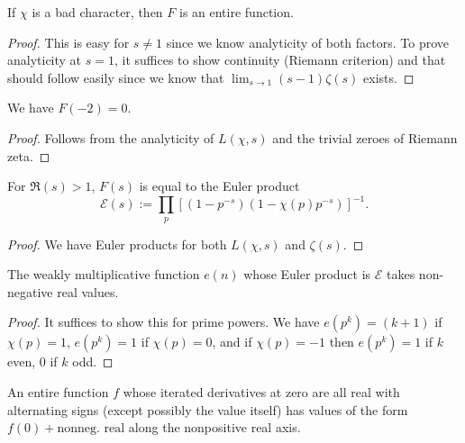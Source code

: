 \begin{lemma} \label{F_entire}
  If $\chi$ is a bad character, then $F$ is an entire function.
\end{lemma}

\begin{proof}
  This is easy for $s \ne 1$ since we know analyticity of both factors. To prove analyticity at $s = 1$, it suffices to show continuity (Riemann criterion) and that should follow easily since we know that $\lim_{s \to 1} (s - 1) \zeta(s)$ exists.
\end{proof}

\begin{lemma} \label{zero_of_F}
  We have $F(-2) = 0$.
\end{lemma}

\begin{proof}
  Follows from the analyticity of $L(\chi, s)$ and the trivial zeroes of Riemann zeta.
\end{proof}

\begin{lemma} \label{F_Euler_product}
  For $\Re(s) > 1$, $F(s)$ is equal to the Euler product
  \[ \mathcal{E}(s) := \prod_p \left[ (1 - p^{-s}) (1 - \chi(p) p^{-s})\right]^{-1}. \]
\end{lemma}

\begin{proof}
  We have Euler products for both $L(\chi, s)$ and $\zeta(s)$.
\end{proof}

\begin{lemma} \label{nonneg_coeffs}
  The weakly multiplicative function $e(n)$ whose Euler product is $\mathcal{E}$ takes non-negative real values.
\end{lemma}

\begin{proof}
  It suffices to show this for prime powers. We have $e(p^k) = (k + 1)$ if $\chi(p) = 1$, $e(p^k) = 1$ if $\chi(p) = 0$, and if $\chi(p) = -1$ then $e(p^k) = 1$ if $k$ even, $0$ if $k$ odd.
\end{proof}

\begin{lemma} \label{positivity_from_derivs}
  \leanok
  An entire function $f$ whose iterated derivatives at zero are all real with alternating signs
  (except possibly the value itself) has values of the form $f(0) + \text{nonneg. real}$
  along the nonpositive real axis.
\end{lemma}

